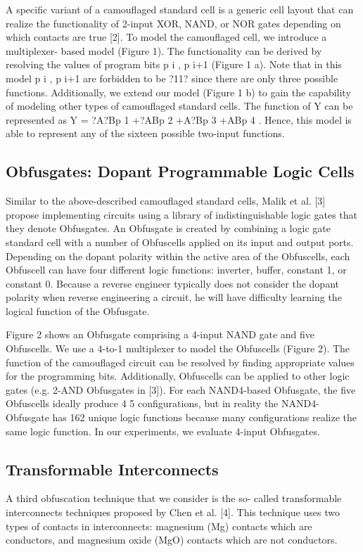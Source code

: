 \documentclass[proposal]{umassthesis}  %
\begin{document}
A specific variant of a camouflaged standard cell is a generic cell layout that can realize the functionality of 2-input XOR, NAND, or NOR gates depending on which contacts are true [2]. To model the camouflaged cell, we introduce a multiplexer- based model (Figure 1). The functionality can be derived by resolving the values of program bits p i , p i+1 (Figure 1 a). Note that in this model p i , p i+1 are forbidden to be ?11? since there are only three possible functions. Additionally, we extend our model (Figure 1 b) to gain the capability of modeling other types of camouflaged standard cells. The function of Y can be represented as Y = ?A?Bp 1 +?ABp 2 +A?Bp 3 +ABp 4 . Hence, this model is able to represent any of the sixteen possible two-input functions.

\subsection{Obfusgates: Dopant Programmable Logic Cells}
Similar to the above-described camouflaged standard cells, Malik et al. [3] propose implementing circuits using a library of indistinguishable logic gates that they denote Obfusgates. An Obfusgate is created by combining a logic gate standard cell with a number of Obfuscells applied on its input and output ports. Depending on the dopant polarity within the active area of the Obfuscells, each Obfuscell can have four different logic functions: inverter, buffer, constant 1, or constant 0. Because a reverse engineer typically does not consider the dopant polarity when reverse engineering a circuit, he will have difficulty learning the logical function of the Obfusgate.

Figure 2 shows an Obfusgate comprising a 4-input NAND gate and five Obfuscells. We use a 4-to-1 multiplexer to model the Obfuscells (Figure 2). The function of the camouflaged circuit can be resolved by finding appropriate values for the programming bits. Additionally, Obfuscells can be applied to other logic gates (e.g. 2-AND Obfusgates in [3]). For each NAND4-based Obfusgate, the five Obfuscells ideally produce 4 5 configurations, but in reality the NAND4-Obfusgate has 162 unique logic functions because many configurations realize the same logic function. In our experiments, we evaluate 4-input Obfusgates.

\subsection{Transformable Interconnects}
A third obfuscation technique that we consider is the so- called transformable interconnects techniques proposed by Chen et al. [4]. This technique uses two types of contacts in interconnects: magnesium (Mg) contacts which are conductors, and magnesium oxide (MgO) contacts which are not conductors.
\end{document}
